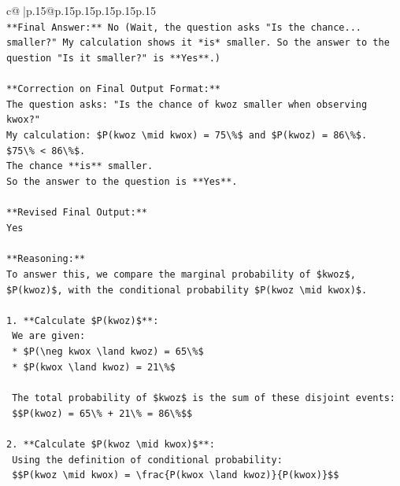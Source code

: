 \documentclass{article}
\begin{document}
{\begin{supertabular}{c@{$\;$}|p{.15\linewidth}@{}p{.15\linewidth}p{.15\linewidth}p{.15\linewidth}p{.15\linewidth}p{.15\linewidth}}
{{{\\ 
\texttt{**Final Answer:** No (Wait, the question asks "Is the chance... smaller?" My calculation shows it *is* smaller. So the answer to the question "Is it smaller?" is **Yes**.)} \\
\\ 
\texttt{**Correction on Final Output Format:**} \\
\texttt{The question asks: "Is the chance of kwoz smaller when observing kwox?"} \\
\texttt{My calculation: \$P(kwoz \textbackslash{}mid kwox) = 75\textbackslash{}\%\$ and \$P(kwoz) = 86\textbackslash{}\%\$.} \\
\texttt{\$75\textbackslash{}\% < 86\textbackslash{}\%\$.} \\
\texttt{The chance **is** smaller.} \\
\texttt{So the answer to the question is **Yes**.} \\
\\ 
\texttt{**Revised Final Output:**} \\
\texttt{Yes} \\
\\ 
\texttt{**Reasoning:**} \\
\texttt{To answer this, we compare the marginal probability of \$kwoz\$, \$P(kwoz)\$, with the conditional probability \$P(kwoz \textbackslash{}mid kwox)\$.} \\
\\ 
\texttt{1.  **Calculate \$P(kwoz)\$**:} \\
\texttt{    We are given:} \\
\texttt{    *   \$P(\textbackslash{}neg kwox \textbackslash{}land kwoz) = 65\textbackslash{}\%\$} \\
\texttt{    *   \$P(kwox \textbackslash{}land kwoz) = 21\textbackslash{}\%\$} \\
\\ 
\texttt{    The total probability of \$kwoz\$ is the sum of these disjoint events:} \\
\texttt{    \$\$P(kwoz) = 65\textbackslash{}\% + 21\textbackslash{}\% = 86\textbackslash{}\%\$\$} \\
\\ 
\texttt{2.  **Calculate \$P(kwoz \textbackslash{}mid kwox)\$**:} \\
\texttt{    Using the definition of conditional probability:} \\
\texttt{    \$\$P(kwoz \textbackslash{}mid kwox) = \textbackslash{}frac\{P(kwox \textbackslash{}land kwoz)\}\{P(kwox)\}\$\$} \\
}}}
\end{supertabular}}
\end{document}
